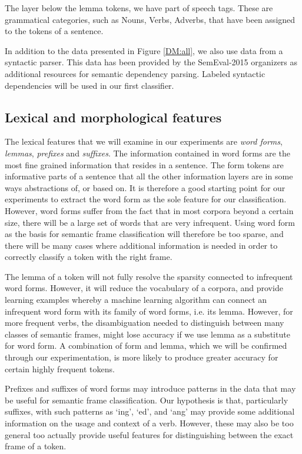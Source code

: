The layer below the lemma tokens, we have part of speech tags. These are grammatical categories, such as Nouns, Verbs, Adverbs, that have been assigned to the tokens of a sentence.

In addition to the data presented in Figure \ref{DM:all}, we also use data from a syntactic parser. This data has been provided by the SemEval-2015 organizers as additional resources for semantic dependency parsing. Labeled syntactic dependencies will be used in our first classifier.

\subsection{Lexical and morphological features}

The lexical features that we will examine in our experiments are \textit{word forms}, \textit{lemmas}, \textit{prefixes} and \textit{suffixes}. The information contained in word forms are the most fine grained information that resides in a sentence. The form tokens are informative parts of a sentence that all the other information layers are in some ways abstractions of, or based on. It is therefore a good starting point for our experiments to extract the word form as the sole feature for our classification. However, word forms suffer from the fact that in most corpora beyond a certain size, there will be a large set of words that are very infrequent. Using word form as the basis for semantic frame classification will therefore be too sparse, and there will be many cases where additional information is needed in order to correctly classify a token with the right frame.

The lemma of a token will not fully resolve the sparsity connected to infrequent word forms. However, it will reduce the vocabulary of a corpora, and provide learning examples whereby a machine learning algorithm can connect an infrequent word form with its family of word forms, i.e. its lemma. However, for more frequent verbs, the disambiguation needed to distinguish between many classes of semantic frames, might lose accuracy if we use lemma as a substitute for word form. A combination of form and lemma, which we will be confirmed through our experimentation, is more likely to produce greater accuracy for certain highly frequent tokens. 

Prefixes and suffixes of word forms may introduce patterns in the data that may be useful for semantic frame classification. Our hypothesis is that, particularly suffixes, with such patterns as `ing', `ed', and `ang' may provide some additional information on the usage and context of a verb. However, these may also be too general too actually provide useful features for distinguishing between the exact frame of a token.

